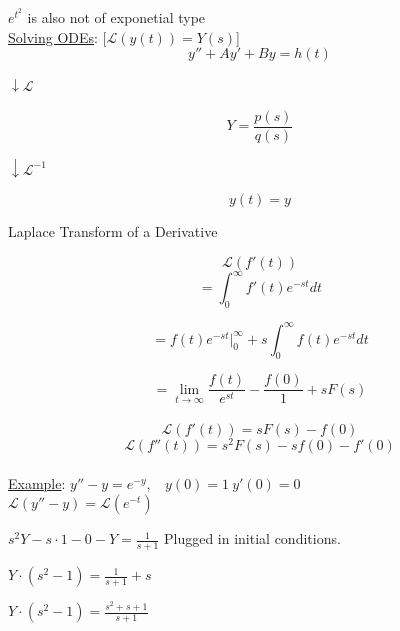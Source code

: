 \documentclass[12pt]{article}
\numberwithin{equation}{subsection}
\newcommand{\lap}{\mathscr{L}}
\newcommand{\inda}{\hspace{.5cm}}
\newcommand{\indc}{\hspace{1.5cm}}
\newcommand{\indd}{\hspace{2cm}}
\newcommand{\indj}{\hspace{5cm}}
\newcommand{\indo}{\hspace{7.5cm}}
\newcommand{\exa}{\noindent \underline{Example}: \hspace{1cm}}
\begin{document}
\indj $e^{t^2}$ is also not of exponetial type\\

\underline{Solving ODEs}: \inda [$\mathscr{L}(y(t))=\mathit{Y}(s)$]
\begin{equation}
y''+Ay'+By=h(t)
\end{equation}

\indo $\downarrow \mathscr{L}$

\begin{equation}
\mathit{Y}=\frac{p(s)}{q(s)}
\end{equation}

\indo $\downarrow \mathscr{L}^{-1}$

\begin{equation}
y(t)=y
\end{equation}

\indc Laplace Transform of a Derivative

\begin{equation}
\mathscr{L}(f'(t))
\end{equation}
\begin{equation}
=\int_0^\infty f'(t)e^{-st} dt
\end{equation}

\begin{equation}
=f(t)e^{-st} \biggr\rvert^{\infty}_0 +s \int_0^\infty f(t)e^{-st} dt
\end{equation}

\begin{equation}
=\lim_{t \rightarrow \infty} \frac{f(t)}{e^{st} } - \frac{f(0)}{1} + sF(s)
\end{equation}\\

\begin{equation}
\mathscr{L}(f'(t))=sF(s) -f(0)
\end{equation}
\begin{equation}
\mathscr{L}(f''(t))=s^2F(s) -sf(0)-f'(0)
\end{equation}\\

\exa $y''-y=e^{-y},\ \ \ \ y(0)=1\ y'(0)=0$\\

\indd $\lap (y''-y)= \lap (e^{-t})$

\indd $s^2Y-s \cdot 1 - 0 - Y = \frac{1}{s+1}$ Plugged in initial conditions.

\indd $Y \cdot (s^2-1) = \frac{1}{s+1}+s $

\indd $Y \cdot (s^2-1) = \frac{s^2+s+1}{s+1}$
\end{document}
